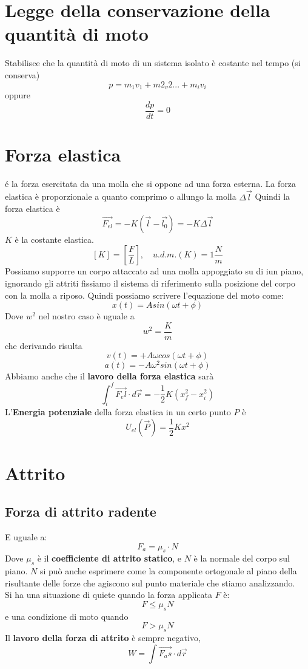 \documentclass[a4paper]{report}
\begin{document}
  \section{Legge della conservazione della quantità di moto}
  Stabilisce che la quantità di moto di un sistema isolato è costante nel tempo (si conserva)
  $$ p = m_1v_1 + m2_v2 ... + m_iv_i $$
  oppure
  $$ \frac{dp}{dt} = 0 $$

  \section{Forza elastica}
  é la forza esercitata da una molla che si oppone ad una forza esterna. La forza elastica è proporzionale a quanto comprimo o allungo la molla $\Delta \vec{l}$
  Quindi la forza elastica è
  $$ \vec{F_{el}} = -K(\vec{l} - \vec{l_0}) = -K \Delta \vec{l} $$
  $K$ è la costante elastica.
  $$[K] = [\frac{F}{L}], \quad u.d.m.(K) = 1 \frac{N}{m}$$
  Possiamo supporre un corpo attaccato ad una molla appoggiato su di iun piano, ignorando gli attriti fissiamo il sistema di riferimento sulla posizione del corpo con la molla a riposo. Quindi possiamo scrivere l'equazione del moto come:
  $$x(t) = A sin(\omega t + \phi)$$
  Dove $w^2$ nel nostro caso è uguale a
  $$ w^2 = \frac{K}{m} $$
  che derivando risulta
  $$ v(t) = + A \omega cos(\omega t + \phi) $$
  $$ a(t) = -A \omega^2 sin (\omega t + \phi) $$
  Abbiamo anche che il \textbf{lavoro della forza elastica} sarà
  $$ \int_i^f \vec{F_el} \cdot d\vec{r} = - \frac{1}{2} K (x_f^2 -x_i^2)$$
  L'\textbf{Energia potenziale} della forza elastica in un certo punto $P$ è
  $$ U_{el}(\vec{P}) = \frac{1}{2} K x^2$$


  \section{Attrito}
  \subsection{Forza di attrito radente}
  E uguale a:
  $$ F_a = \mu_s \cdot N$$
  Dove $\mu_s$ è il \textbf{coefficiente di attrito statico}, e $N$ è la normale del corpo sul piano. $N$ si può anche esprimere come la componente ortogonale al piano della risultante delle forze che agiscono sul punto materiale che stiamo analizzando.
  \\Si ha una situazione di quiete quando la forza applicata $F$ è:
  $$ F \leq \mu_s N $$
  e una condizione di moto quando
  $$ F > \mu_s N $$
  Il \textbf{lavoro della forza di attrito} è sempre negativo,
  $$ W = \int \vec{F_as} \cdot d\vec{r}$$
\end{document}
